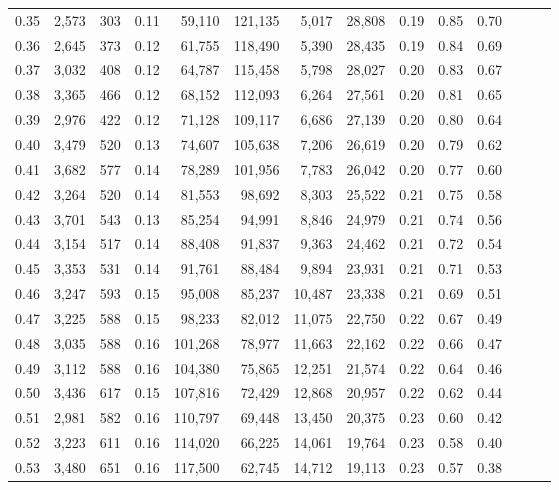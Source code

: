 \begin{tabular}{rrrrrrrrrrrrrr}
0.35 &  2,573 &  303 &  0.11 &   59,110 &  121,135 &   5,017 &  28,808 &  0.19 &  0.85 &      0.70 \\
0.36 &  2,645 &  373 &  0.12 &   61,755 &  118,490 &   5,390 &  28,435 &  0.19 &  0.84 &      0.69 \\
0.37 &  3,032 &  408 &  0.12 &   64,787 &  115,458 &   5,798 &  28,027 &  0.20 &  0.83 &      0.67 \\
0.38 &  3,365 &  466 &  0.12 &   68,152 &  112,093 &   6,264 &  27,561 &  0.20 &  0.81 &      0.65 \\
0.39 &  2,976 &  422 &  0.12 &   71,128 &  109,117 &   6,686 &  27,139 &  0.20 &  0.80 &      0.64 \\
0.40 &  3,479 &  520 &  0.13 &   74,607 &  105,638 &   7,206 &  26,619 &  0.20 &  0.79 &      0.62 \\
0.41 &  3,682 &  577 &  0.14 &   78,289 &  101,956 &   7,783 &  26,042 &  0.20 &  0.77 &      0.60 \\
0.42 &  3,264 &  520 &  0.14 &   81,553 &   98,692 &   8,303 &  25,522 &  0.21 &  0.75 &      0.58 \\
0.43 &  3,701 &  543 &  0.13 &   85,254 &   94,991 &   8,846 &  24,979 &  0.21 &  0.74 &      0.56 \\
0.44 &  3,154 &  517 &  0.14 &   88,408 &   91,837 &   9,363 &  24,462 &  0.21 &  0.72 &      0.54 \\
0.45 &  3,353 &  531 &  0.14 &   91,761 &   88,484 &   9,894 &  23,931 &  0.21 &  0.71 &      0.53 \\
0.46 &  3,247 &  593 &  0.15 &   95,008 &   85,237 &  10,487 &  23,338 &  0.21 &  0.69 &      0.51 \\
0.47 &  3,225 &  588 &  0.15 &   98,233 &   82,012 &  11,075 &  22,750 &  0.22 &  0.67 &      0.49 \\
0.48 &  3,035 &  588 &  0.16 &  101,268 &   78,977 &  11,663 &  22,162 &  0.22 &  0.66 &      0.47 \\
0.49 &  3,112 &  588 &  0.16 &  104,380 &   75,865 &  12,251 &  21,574 &  0.22 &  0.64 &      0.46 \\
0.50 &  3,436 &  617 &  0.15 &  107,816 &   72,429 &  12,868 &  20,957 &  0.22 &  0.62 &      0.44 \\
0.51 &  2,981 &  582 &  0.16 &  110,797 &   69,448 &  13,450 &  20,375 &  0.23 &  0.60 &      0.42 \\
0.52 &  3,223 &  611 &  0.16 &  114,020 &   66,225 &  14,061 &  19,764 &  0.23 &  0.58 &      0.40 \\
0.53 &  3,480 &  651 &  0.16 &  117,500 &   62,745 &  14,712 &  19,113 &  0.23 &  0.57 &      0.38 \\

\end{tabular}
